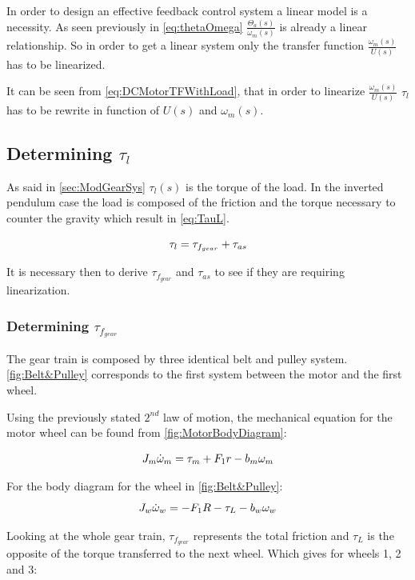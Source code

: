 In order to design an effective feedback control system a linear model is a necessity. As seen previously in \autoref{eq:thetaOmega} $\frac{\Theta_a(s)}{\omega_m(s)}$ is already a linear relationship. So in order to get a linear system only the transfer function $\frac{\omega_m(s)}{U(s)}$ has to be linearized.

It can be seen from \autoref{eq:DCMotorTFWithLoad}, that in order to linearize $\frac{\omega_m(s)}{U(s)}$ $\tau_l$ has to be rewrite in function of $U(s)$ and $\omega_m(s)$.

\subsection{Determining $\tau_l$}
As said in \autoref{sec:ModGearSys} $\tau_l(s)$ is the torque of the load. In the inverted pendulum case the load is composed of the friction and the torque necessary to counter the gravity which result in \autoref{eq:TauL}.

\begin{equation}\label{eq:TauL}
	\tau_l = \tau_{f_{gear}} + \tau_{as} \addunit{\newton\meter}
\end{equation}

It is necessary then to derive $\tau_{f_{gear}}$ and $\tau_{as}$ to see if they are requiring linearization.


\subsubsection*{Determining $\tau_{f_{gear}}$}
The gear train is composed by three identical belt and pulley system. \autoref{fig:Belt&Pulley} corresponds to the first system between the motor and the first wheel. 

Using the previously stated $2^{nd}$ law of motion, the mechanical equation for the motor wheel can be found from \autoref{fig:MotorBodyDiagram}:

\begin{equation}
    J_m \dot{\omega}_m = \tau_m + F_1r - b_m\omega_m \addunit{\newton\meter}
    \label{eq:MotorfreeBody}
\end{equation}

For the body diagram for the wheel in \autoref{fig:Belt&Pulley}:
\begin{equation}
	J_w\dot{\omega}_w = -F_1R -\tau_L -b_w\omega_w \addunit{\newton\meter}
\end{equation}

Looking at the whole gear train, $\tau_{f_{gear}}$ represents the total friction and $\tau_L$ is the opposite of the torque transferred to the next wheel. Which gives for wheels 1, 2 and 3:

